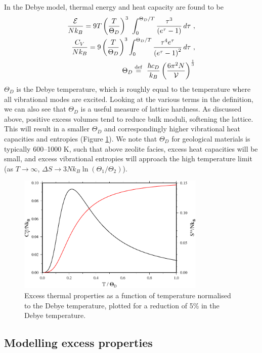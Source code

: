 In the Debye model, thermal energy and heat capacity are found to be
\begin{eqnarray}
\frac{\mathcal{E}}{Nk_B} = 9 T \left({T\over \Theta_D}\right)^3\ \int_0^{\Theta_D/T} {\tau^3 \over \left(e^\tau-1\right)}\, d\tau\ ,\\
\frac{C_V}{Nk_B} = 9 \left({T\over \Theta_D}\right)^3\int_0^{\Theta_D/T} {\tau^4 e^\tau\over\left(e^\tau-1\right)^2}\, d\tau\ ,\\
\Theta_D \stackrel{\mathrm{def}}{=}\  {\hbar c_D \over k_B} \left( {6 \pi^2 N \over \mathcal{V}} \right)^{1\over3} \label{debye}
\end{eqnarray}
\noindent $\Theta_D$ is the Debye temperature, which is roughly equal to the temperature where all vibrational modes are excited. Looking at the various terms in the definition, we can also see that $\Theta_D$ is a useful measure of lattice hardness. As discussed above, positive excess volumes tend to reduce bulk moduli, softening the lattice. This will result in a smaller $\Theta_D$ and correspondingly higher vibrational heat capacities and entropies (Figure \ref{fig:debye_excesses}). We note that $\Theta_D$ for geological materials is typically 600--1000 K, such that above zeolite facies, excess heat capacities will be small, and excess vibrational entropies will approach the high temperature limit (as $T \rightarrow \infty$, $\Delta S \rightarrow 3Nk_B\ln (\Theta_{1} / \Theta_{2})$). 


\begin{figure}[ht!]
  \centering
  \includegraphics[width=0.8\textwidth]{figures/debye_excesses}
  \caption{Excess thermal properties as a function of temperature normalised to the Debye temperature, plotted for a reduction of 5\% in the Debye temperature.}
  \label{fig:debye_excesses}
\end{figure}


\subsection{Modelling excess properties}

